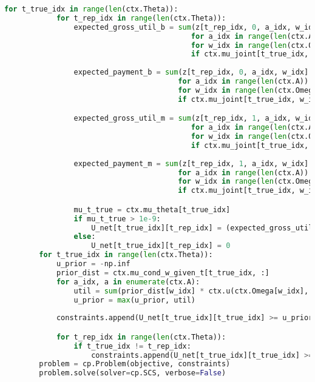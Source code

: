 \begin{lstlisting}[language=Python,style=pythonstyle]
        for t_true_idx in range(len(ctx.Theta)):
            for t_rep_idx in range(len(ctx.Theta)):
                expected_gross_util_b = sum(z[t_rep_idx, 0, a_idx, w_idx] * ctx.u(ctx.Omega[w_idx], ctx.A[a_idx])
                                           for a_idx in range(len(ctx.A))
                                           for w_idx in range(len(ctx.Omega))
                                           if ctx.mu_joint[t_true_idx, w_idx] > 0) 
                
                expected_payment_b = sum(z[t_rep_idx, 0, a_idx, w_idx] * ctx.b
                                        for a_idx in range(len(ctx.A))
                                        for w_idx in range(len(ctx.Omega))
                                        if ctx.mu_joint[t_true_idx, w_idx] > 0)

                expected_gross_util_m = sum(z[t_rep_idx, 1, a_idx, w_idx] * ctx.u(ctx.Omega[w_idx], ctx.A[a_idx])
                                           for a_idx in range(len(ctx.A))
                                           for w_idx in range(len(ctx.Omega))
                                           if ctx.mu_joint[t_true_idx, w_idx] > 0)
                
                expected_payment_m = sum(z[t_rep_idx, 1, a_idx, w_idx] * (-ctx.M)
                                        for a_idx in range(len(ctx.A))
                                        for w_idx in range(len(ctx.Omega))
                                        if ctx.mu_joint[t_true_idx, w_idx] > 0)

                mu_t_true = ctx.mu_theta[t_true_idx]
                if mu_t_true > 1e-9:
                    U_net[t_true_idx][t_rep_idx] = (expected_gross_util_b + expected_gross_util_m - expected_payment_b - expected_payment_m) / mu_t_true
                else:
                    U_net[t_true_idx][t_rep_idx] = 0
        for t_true_idx in range(len(ctx.Theta)):
            u_prior = -np.inf
            prior_dist = ctx.mu_cond_w_given_t[t_true_idx, :]
            for a_idx, a in enumerate(ctx.A):
                util = sum(prior_dist[w_idx] * ctx.u(ctx.Omega[w_idx], a) for w_idx in range(len(ctx.Omega)))
                u_prior = max(u_prior, util)
            
            constraints.append(U_net[t_true_idx][t_true_idx] >= u_prior)

            for t_rep_idx in range(len(ctx.Theta)):
                if t_true_idx != t_rep_idx:
                    constraints.append(U_net[t_true_idx][t_true_idx] >= U_net[t_true_idx][t_rep_idx])
        problem = cp.Problem(objective, constraints)
        problem.solve(solver=cp.SCS, verbose=False)
    

\end{lstlisting}
